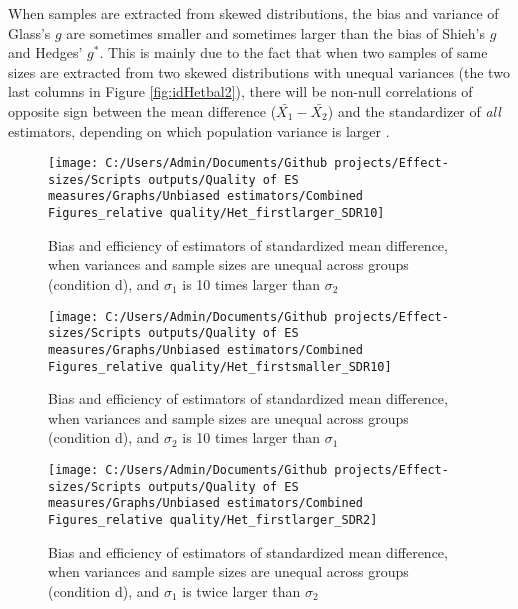 \documentclass[
  12pt,
  french,
]{article}
\begin{document}
When samples are extracted from skewed distributions, the bias and
variance of Glass's \(g\) are sometimes smaller and sometimes larger
than the bias of Shieh's \(g\) and Hedges' \(g^*\). This is mainly due
to the fact that when two samples of same sizes are extracted from two
skewed distributions with unequal variances (the two last columns in
Figure \ref{fig:idHetbal2}), there will be non-null correlations of
opposite sign between the mean difference (\(\bar{X_1}-\bar{X_2}\)) and
the standardizer of \emph{all} estimators, depending on which population
variance is larger
.

\begin{figure}

{\centering \texttt{[image: C:/Users/Admin/Documents/Github projects/Effect-sizes/Scripts outputs/Quality of ES measures/Graphs/Unbiased estimators/Combined Figures\_relative quality/Het\_firstlarger\_SDR10]} 

}

\caption{Bias and efficiency of estimators of standardized mean difference, when variances and sample sizes are unequal across groups (condition d), and $\sigma_1$ is 10 times larger than $\sigma_2$}\label{fig:idHetunbal1}
\end{figure}

\begin{figure}

{\centering \texttt{[image: C:/Users/Admin/Documents/Github projects/Effect-sizes/Scripts outputs/Quality of ES measures/Graphs/Unbiased estimators/Combined Figures\_relative quality/Het\_firstsmaller\_SDR10]} 

}

\caption{Bias and efficiency of estimators of standardized mean difference, when variances and sample sizes are unequal across groups (condition d), and $\sigma_2$ is 10 times larger than $\sigma_1$}\label{fig:idHetunbal2}
\end{figure}

\begin{figure}

{\centering \texttt{[image: C:/Users/Admin/Documents/Github projects/Effect-sizes/Scripts outputs/Quality of ES measures/Graphs/Unbiased estimators/Combined Figures\_relative quality/Het\_firstlarger\_SDR2]} 

}

\caption{Bias and efficiency of estimators of standardized mean difference, when variances and sample sizes are unequal across groups (condition d), and $\sigma_1$ is twice larger than $\sigma_2$}\label{fig:idHetunbal3}
\end{figure}
\end{document}
